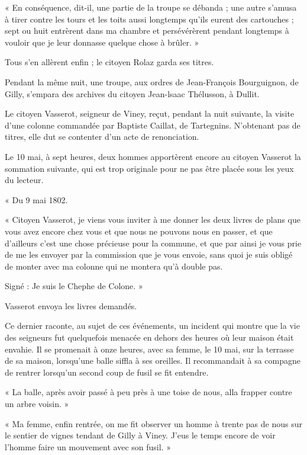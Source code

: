 \documentclass[french,twoside]{book} %
\newenvironment{quoteblock}%
  {\begin{quoting}}
  {\end{quoting}}
\newenvironment{quotebar}{%
    \def\FrameCommand{{\color{rubric!10!}\vrule width 0.5em} \hspace{0.9em}}%
    \def\OuterFrameSep{\itemsep} %
    \MakeFramed {\advance\hsize-\width \FrameRestore}
  }%
  {%
    \endMakeFramed
  }
\renewenvironment{quoteblock}%
  {%
    \savenotes
    \setstretch{0.9}
    \begin{quotebar}
  }
  {%
    \end{quotebar}
    \spewnotes
  }
\begin{document}
\begin{quoteblock}
 \noindent « En conséquence, dit-il, une partie de la troupe se débanda ; une autre s’amusa à tirer contre les tours et les toits aussi longtemps qu’ils eurent des cartouches ; sept ou huit entrèrent dans ma chambre et persévérèrent pendant longtemps à vouloir que je leur donnasse quelque chose à brûler. »
 \end{quoteblock}

\noindent Tous s’en allèrent enfin ; le citoyen Rolaz garda ses titres.\par
Pendant la même nuit, une troupe, aux ordres de Jean-François Bourguignon, de Gilly, s’empara des archives du citoyen Jean-lsaac Thélusson, à Dullit.\par
Le citoyen Vasserot, seigneur de Viney, reçut, pendant la nuit suivante, la visite d’une colonne commandée par Baptiste Caillat, de Tartegnins. N’obtenant pas de titres, elle dut se contenter d’un acte de renonciation.\par
Le 10 mai, à sept heures, deux hommes apportèrent encore au citoyen Vasserot la sommation suivante, qui est trop originale pour ne pas être placée sous les yeux du lecteur.\par

\begin{quoteblock}
 \noindent « Du 9 mai 1802.\par
 « Citoyen Vasserot, je viens vous inviter à me donner les deux livres de plans que vous avez encore chez vous et que nous ne pouvons nous en passer, et que d’ailleurs c’est une chose précieuse pour la commune, et que par ainsi je vous prie de me les envoyer par la commission que je vous envoie, sans quoi je suis obligé de monter avec ma colonne qui ne montera qu’à double pas.\par
 Signé : Je suis le Chephe de Colone. »
 \end{quoteblock}

\noindent Vasserot envoya les livres demandés.\par
Ce dernier raconte, au sujet de ces événements, un incident qui montre que la vie des seigneurs fut quelquefois menacée en dehors des heures où leur maison était envahie. Il se promenait à onze heures, avec sa femme, le 10 mai, sur la terrasse de sa maison, lorsqu’une balle siffla à ses oreilles. Il recommandait à sa compagne de rentrer lorsqu’un second coup de fusil se fit entendre.\par

\begin{quoteblock}
 \noindent « La balle, après avoir passé à peu près à une toise de nous, alla frapper contre un arbre voisin. »\par
 « Ma femme, enfin rentrée, on me fit observer un homme à trente pas de nous sur le sentier de vignes tendant de Gilly à Viney. J’eus le temps encore de voir l’homme faire un mouvement avec son fusil. »
 \end{quoteblock}
\end{document}
